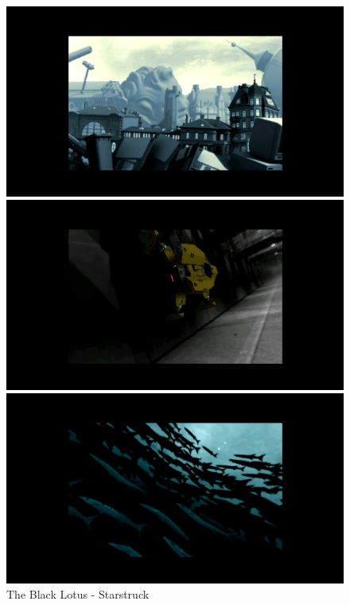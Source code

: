 \begin{figure}[h]
  \begin{minipage}[b]{0.30\linewidth}
    \centering
    \includegraphics[width=\linewidth]{images/demoscene/demos/start1.png}
  \end{minipage}
  \hfill
  \begin{minipage}[b]{0.30\linewidth}
    \centering
    \includegraphics[width=\linewidth]{images/demoscene/demos/start2.png}
  \end{minipage}
  \hfill
  \begin{minipage}[b]{0.30\linewidth}
    \centering
    \includegraphics[width=\linewidth]{images/demoscene/demos/start3.png}
  \end{minipage}
  \caption{The Black Lotus - Starstruck}
  \label{lotus}
\end{figure}

